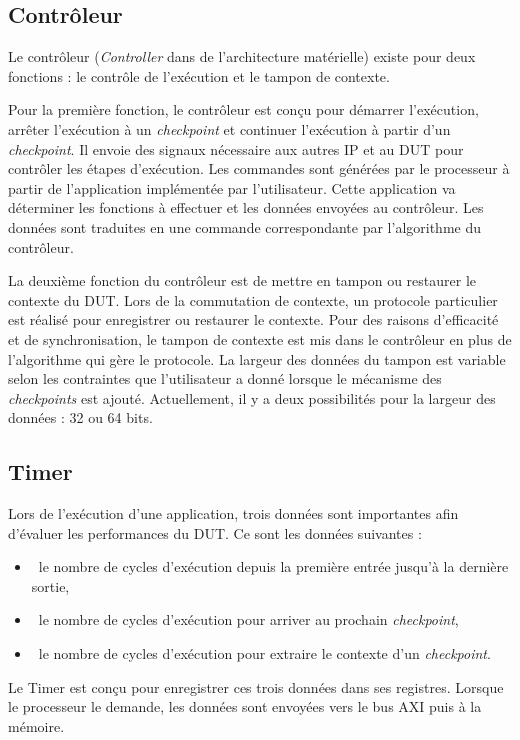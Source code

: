 \subsection{Contrôleur}

Le contrôleur (\emph{Controller} dans de l'architecture matérielle) existe pour deux fonctions : le contrôle
de l'exécution et le tampon de contexte.

Pour la première fonction, le contrôleur est conçu pour démarrer l'exécution, arrêter l'exécution à un
\emph{checkpoint} et continuer l'exécution à partir d'un \emph{checkpoint}. 
Il envoie des signaux nécessaire aux autres IP et au DUT pour contrôler les étapes d'exécution.
Les commandes sont générées par le processeur à partir de l'application implémentée par l'utilisateur. Cette application va déterminer
les fonctions à effectuer et les données envoyées au contrôleur. Les données sont traduites en une commande
correspondante par l'algorithme du contrôleur.

La deuxième fonction du contrôleur est de mettre en tampon ou restaurer le contexte du DUT.
Lors de la commutation de contexte, un protocole particulier est réalisé pour enregistrer ou restaurer le contexte.
Pour des raisons d'efficacité et de synchronisation, le tampon de contexte est mis dans le contrôleur en plus de l'algorithme
qui gère le protocole. La largeur des données du tampon est variable selon les contraintes que l'utilisateur a donné
lorsque le mécanisme des \emph{checkpoints} est ajouté.
Actuellement, il y a deux possibilités pour la largeur des données : 32 ou 64 bits.

\subsection{Timer}
\label{subsec:timer}
Lors de l'exécution d'une application, trois données sont importantes afin d'évaluer les performances
du DUT. Ce sont les données suivantes :
\begin{itemize}
	\item\ le nombre de cycles d'exécution depuis la première entrée jusqu'à la dernière sortie,
	\item\ le nombre de cycles d'exécution pour arriver au prochain \emph{checkpoint},
	\item\ le nombre de cycles d'exécution pour extraire le contexte d'un \emph{checkpoint}.
\end{itemize}
Le Timer est conçu pour enregistrer ces trois données dans ses registres. Lorsque le processeur le demande,
les données sont envoyées vers le bus AXI puis à la mémoire.

